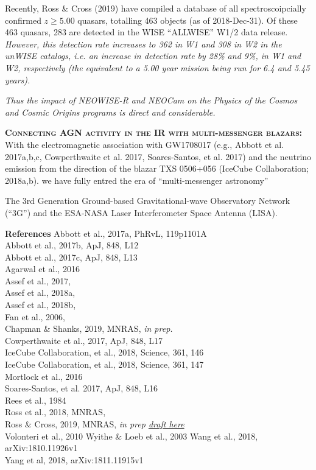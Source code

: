 \documentclass[12pt]{article}
\begin{document}
\smallskip
\smallskip
\noindent
Recently, Ross \& Cross (2019) have compiled a database of all 
spectroscoipcially confirmed $z\geq5.00$ quasars, totalling 463 objects (as of 
2018-Dec-31). Of these 463 quasars, 283 are detected in the WISE ``ALLWISE'' W1/2 
data release. {\it However, this detection rate increases to 362 in W1 and 308 in W2 
in the unWISE catalogs, i.e. an increase in detection rate by 28\% and 9\%, in W1 and W2, 
respectively (the equivalent to a 5.00 year mission being run for 6.4 and 5.45 years).}

\smallskip
\smallskip
\noindent
{\it Thus the impact of NEOWISE-R and NEOCam on the Physics of the Cosmos and 
Cosmic Origins programs is direct and considerable.}

\smallskip
\smallskip
\noindent
\textbf{\textsc{Connecting AGN activity in the IR with multi-messenger blazars: }}
With the electromagnetic association with GW1708017 (e.g., Abbott et
al. 2017a,b,c, Cowperthwaite et al. 2017, Soares-Santos, et
al. 2017)
and the neutrino emission from the direction of the blazar TXS 0506+056 
(IceCube Collaboration; 2018a,b).
we have  fully entred the era of ``multi-messenger astronomy'' 

The 3rd Generation Ground-based Gravitational-wave Observatory Network
(``3G'') and the ESA-NASA Laser Interferometer Space Antenna (LISA). 

\smallskip
\smallskip
\noindent





\pagebreak
\textbf{References}
Abbott et al., 2017a,  PhRvL, 119p1101A	\\
Abbott et al., 2017b, ApJ, 848, L12	\\
Abbott et al., 2017c, ApJ, 848, L13	\\
Agarwal et al., 2016 \\
Assef et al., 2017, \\
Assef et al., 2018a, \\
Assef et al., 2018b, \\
Fan  et al., 2006, \\
Chapman \& Shanks, 2019, MNRAS, {\it in prep.} \\
Cowperthwaite et al., 2017,  ApJ, 848, L17	\\
IceCube Collaboration, et al., 2018, Science, 361, 146 \\ 
IceCube Collaboration, et al., 2018, Science, 361, 147 \\
Mortlock  et al., 2016 \\
Soares-Santos, et al. 2017, ApJ, 848, L16	\\
Rees  et al., 1984 \\
Ross et al., 2018, MNRAS, \\
Ross \& Cross, 2019, MNRAS, {\it in prep \href{https://github.com/d80b2t/VHzQ}{draft here}} \\
Volonteri  et al., 2010
Wyithe \& Loeb et al., 2003
Wang et al., 2018,  arXiv:1810.11926v1 \\
Yang et al, 2018, arXiv:1811.11915v1 \\
\end{document}
